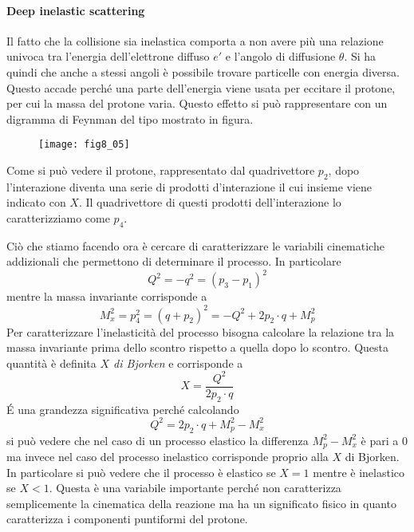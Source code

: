 \paragraph{Deep inelastic scattering}
Il fatto che la collisione sia inelastica comporta a non avere più una relazione univoca tra l'energia dell'elettrone diffuso $e'$ e l'angolo di diffusione $\theta$.
Si ha quindi che anche a stessi angoli è possibile trovare particelle con energia diversa.
Questo accade perché una parte dell'energia viene usata per eccitare il protone, per cui la massa del protone varia.
Questo effetto si può rappresentare con un digramma di Feynman del tipo mostrato in figura.
\begin{figure}[h]
\centering
\texttt{[image: fig8\_05]}
\end{figure}

Come si può vedere il protone, rappresentato dal quadrivettore $p_2$, dopo l'interazione diventa una serie di prodotti d'interazione il cui insieme viene indicato con $X$.
Il quadrivettore di questi prodotti dell'interazione lo caratterizziamo come $p_4$.

Ciò che stiamo facendo ora è cercare di caratterizzare le variabili cinematiche addizionali che permettono di determinare il processo.
In particolare
\begin{equation}
Q^2=-q^2=(p_3-p_1)^2
\end{equation}
mentre la massa invariante corrisponde a 
\begin{equation}
M^2_x=p_4^2=(q+p_2)^2=-Q^2+2p_2\cdot q+M_p^2
\end{equation}
Per caratterizzare l'inelasticità del processo bisogna calcolare la relazione tra la massa invariante prima dello scontro rispetto a quella dopo lo scontro.
Questa quantità è definita \emph{$X$ di Bjorken} e corrisponde a 
\begin{equation}
X=\frac{Q^2}{2p_2\cdot q}
\end{equation}
\'E una grandezza significativa perché calcolando
\begin{equation}
Q^2=2p_2\cdot q+M_p^2-M_x^2
\end{equation}
si può vedere che nel caso di un processo elastico la differenza $M_p^2-M_x^2$ è pari a $0$ ma invece nel caso del processo inelastico corrisponde proprio alla $X$ di Bjorken.
In particolare si può vedere che il processo è elastico se $X=1$ mentre è inelastico se $X<1$.
Questa è una variabile importante perché non caratterizza semplicemente la cinematica della reazione ma ha un significato fisico in quanto caratterizza i componenti puntiformi del protone.


